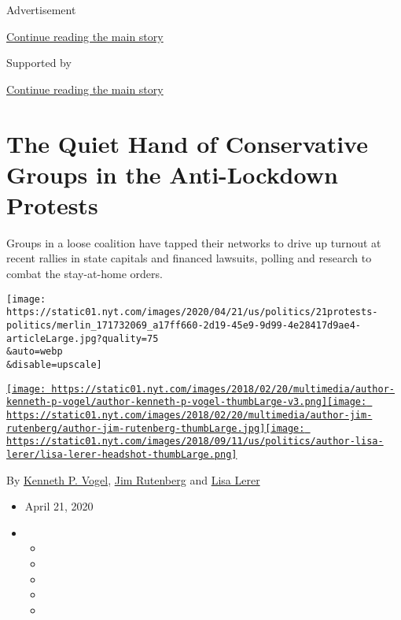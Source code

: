 Advertisement

\protect\hyperlink{after-top}{Continue reading the main story}

Supported by

\protect\hyperlink{after-sponsor}{Continue reading the main story}

\hypertarget{the-quiet-hand-of-conservative-groups-in-the-anti-lockdown-protests}{%
\section{The Quiet Hand of Conservative Groups in the Anti-Lockdown
Protests}\label{the-quiet-hand-of-conservative-groups-in-the-anti-lockdown-protests}}

Groups in a loose coalition have tapped their networks to drive up
turnout at recent rallies in state capitals and financed lawsuits,
polling and research to combat the stay-at-home orders.

\texttt{[image: https://static01.nyt.com/images/2020/04/21/us/politics/21protests-politics/merlin\_171732069\_a17ff660-2d19-45e9-9d99-4e28417d9ae4-articleLarge.jpg?quality=75\\\&auto=webp\\\&disable=upscale]}

\href{https://www.nytimes.com/by/kenneth-p-vogel}{\texttt{[image: https://static01.nyt.com/images/2018/02/20/multimedia/author-kenneth-p-vogel/author-kenneth-p-vogel-thumbLarge-v3.png]}}\href{https://www.nytimes.com/by/jim-rutenberg}{\texttt{[image: https://static01.nyt.com/images/2018/02/20/multimedia/author-jim-rutenberg/author-jim-rutenberg-thumbLarge.jpg]}}\href{https://www.nytimes.com/by/lisa-lerer}{\texttt{[image: https://static01.nyt.com/images/2018/09/11/us/politics/author-lisa-lerer/lisa-lerer-headshot-thumbLarge.png]}}

By \href{https://www.nytimes.com/by/kenneth-p-vogel}{Kenneth P. Vogel},
\href{https://www.nytimes.com/by/jim-rutenberg}{Jim Rutenberg} and
\href{https://www.nytimes.com/by/lisa-lerer}{Lisa Lerer}

\begin{itemize}
\item
  April 21, 2020
\item
  \begin{itemize}
  \item
  \item
  \item
  \item
  \item
  \end{itemize}
\end{itemize}

